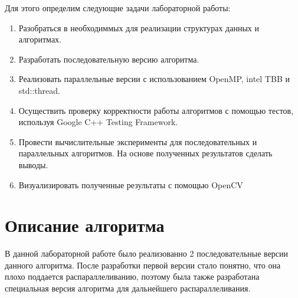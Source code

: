 \documentclass{report}
\begin{document}
\par Для этого определим следующие задачи лабораторной работы:

\begin{enumerate}
\item Разобраться в необходиммых для реализации структурах данных и алгоритмах.
\item Разработать последовательную версию алгоритма.
\item Реализовать параллельные версии с использованием OpenMP, intel TBB и std::thread.
\item Осуществить проверку корректности работы алгоритмов с помощью тестов, используя Google C++ Testing Framework.
\item Провести вычислительные эксперименты для последовательных и параллельных алгоритмов. На основе полученных результатов сделать выводы.
\item Визуализировать полученные результаты с помощью OpenCV


\end{enumerate}

\newpage
\section*{Описание алгоритма}
\par В данной лабораторной работе было реализованно 2 последовательные версии данного алгоритма. После разработки первой версии стало понятно, что она плохо поддается распараллеливанию, поэтому была также разработана специальная версия алгоритма для дальнейшего распараллеливания.
\end{document}
